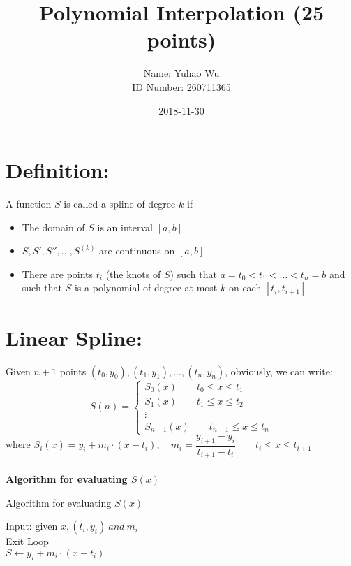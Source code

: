 \documentclass [9 pt]{article}
\theoremstyle{definition}
\begin{document}
\title{Polynomial Interpolation (25 points)}
\date{2018-11-30}
\author{Name: Yuhao Wu\\
ID Number: 260711365
}
\maketitle


\section*{Definition:}
A function $S$ is called a spline of degree $k$ if
\begin{itemize}
	\item The domain of $S$ is an interval $[a, b]$
	\item $S, S', S'', \ldots , S^{(k)}$ are continuous on $[a, b]$
	\item There are points $t_i$ (the knots of $S$) such that $a = t_0 < t_1 < \ldots < t_n = b$ and such that $S$ is a polynomial of degree at most $k$ on each $[t_i, t_{i+1}]$
\end{itemize}

\section*{Linear Spline:}
Given $n + 1$ points $(t_0, y_0), (t_1, y_1), \ldots, (t_n, y_n)$, obviously, we can write:
$$
S(n) = 
\begin{cases}
	S_0(x) \quad \quad t_0 \leq x \leq t_1\\
	S_1(x) \quad \quad t_1 \leq x \leq t_2\\
	\vdots\\
	S_{n - 1}(x) \quad\quad t_{n - 1} \leq x \leq t_n
\end{cases}
$$
where $S_i(x) = y_i + m_i \cdot (x - t_i), \quad m_i = \dfrac{y_{i + 1} - y_i}{t_{i+1} - t_i} \quad\quad t_i \leq x \leq t_{i+1}$
\\
\\
\textbf{Algorithm for evaluating $S(x)$}
\begin{algorithm}
\caption{Algorithm for evaluating $S(x)$}
\begin{algorithmic}[1]
\State Input: given $x, (t_i, y_i)\ and\ m_i$ 
\State {}
\\
 
		\State Exit Loop
	\EndIf
\EndFor
\\
\State $S\gets y_i + m_i\cdot (x - t_i)$

\end{algorithmic}
\end{algorithm}
\end{document}
